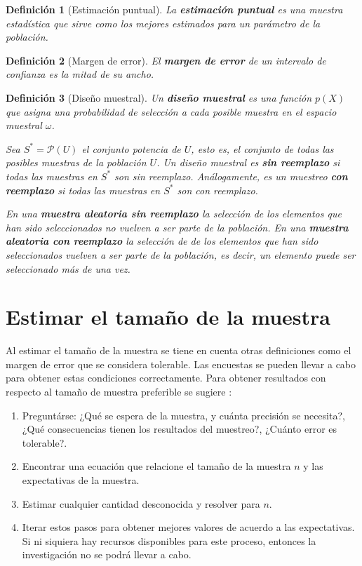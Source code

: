 \documentclass{report}
\newtheorem{definition}{Definición}
\begin{document}
\begin{definition}[Estimación puntual]
    La \textbf{estimación puntual} es una muestra estadística que sirve como los mejores estimados para un parámetro de la población.
\end{definition}

\begin{definition}[Margen de error]
    El \textbf{margen de error} de un intervalo de confianza es la mitad de su ancho.
\end{definition}

\begin{definition}[Diseño muestral]
    Un \textbf{diseño muestral} es una función $p(X)$ que asigna una probabilidad de selección a cada posible muestra en el espacio muestral $\omega$.
    
    \bigbreak
    
    Sea $S^* = \mathcal{P}(U)$ el conjunto potencia de $U$, esto es, el conjunto de todas las posibles muestras de la población $U$. Un diseño muestral es \textbf{sin reemplazo} si todas las muestras en $S^*$ son sin reemplazo. Análogamente, es un muestreo \textbf{con reemplazo} si todas las muestras en $S^*$ son con reemplazo.

    \bigbreak
    
    En una \textbf{muestra aleatoria sin reemplazo} la selección de los elementos que han sido seleccionados no vuelven a ser parte de la población. En una \textbf{muestra aleatoria con reemplazo} la selección de de los elementos que han sido seleccionados vuelven a ser parte de la población, es decir, un elemento puede ser seleccionado más de una vez.
\end{definition}

\section{Estimar el tamaño de la muestra}

Al estimar el tamaño de la muestra se tiene en cuenta otras definiciones como el margen de error que se considera tolerable. Las encuestas se pueden llevar a cabo para obtener estas condiciones correctamente. Para obtener resultados con respecto al tamaño de muestra preferible se sugiere \cite{lohr-2009}:

\begin{enumerate}
    \item Preguntárse: ¿Qué se espera de la muestra, y cuánta precisión se necesita?, ¿Qué consecuencias tienen los resultados del muestreo?, ¿Cuánto error es tolerable?.
    
    \item Encontrar una ecuación que relacione el tamaño de la muestra $n$ y las expectativas de la muestra.
    
    \item Estimar cualquier cantidad desconocida y resolver para $n$.
    
    \item Iterar estos pasos para obtener mejores valores de acuerdo a las expectativas. Si ni siquiera hay recursos disponibles para este proceso, entonces la investigación no se podrá llevar a cabo.
\end{enumerate}
\end{document}
